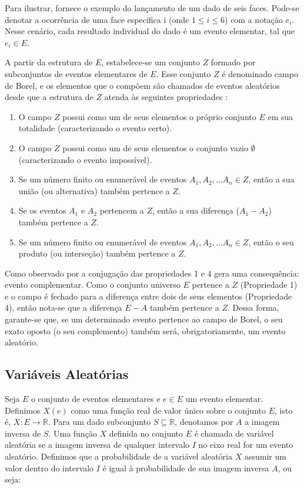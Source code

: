 \documentclass[
    12pt,                %
    openright,           %
    oneside,             %
    a4paper,             %
    english,             %
    brazil               %
]{abntex2}
\begin{document}
Para ilustrar,  fornece o exemplo do lançamento de um dado de seis faces. Pode-se denotar a ocorrência de uma face específica i 
(onde $1 \leq i \leq 6$) com a notação $e_i$. Nesse cenário, cada resultado individual do dado é um evento elementar, tal que $e_i \in E$.

A partir da estrutura de $E$, estabelece-se um conjunto $Z$ formado por subconjuntos de eventos elementares de $E$. Esse conjunto $Z$ é denominado campo de Borel, 
e os elementos que o compõem são chamados de eventos aleatórios desde que a estrutura de $Z$ atenda às seguintes propriedades \cite{FISZ}:

\begin{enumerate}
    \item O campo $Z$ possui como um de seus elementos o próprio conjunto $E$ em sua totalidade (caracterizando o evento certo).
    \item O campo $Z$ possui como um de seus elementos o conjunto vazio $\emptyset$ (caracterizando o evento impossível).
    \item Se um número finito ou enumerável de eventos $A_1, A_2, \dots A_n \in Z$, então a sua união (ou alternativa) também pertence a $Z$.
    \item Se os eventos $A_1$ e $A_2$ pertencem a $Z$, então a sua diferença ($A_1 - A_2$) também pertence a $Z$.
    \item Se um número finito ou enumerável de eventos $A_1, A_2, \dots A_n \in Z$, então o seu produto (ou interseção) também pertence a $Z$.
\end{enumerate}

Como observado por  a conjugação das propriedades 1 e 4 gera uma consequência: evento complementar. Como o conjunto universo $E$ pertence a $Z$ (Propriedade 1) 
e o campo é fechado para a diferença entre dois de seus elementos (Propriedade 4), então nota-se que a diferença $E - A$ também pertence a $Z$. Dessa forma, garante-se que, 
se um determinado evento pertence ao campo de Borel, o seu exato oposto (o seu complemento) também será, obrigatoriamente, um evento aleatório.

\subsection{Variáveis Aleatórias}

Seja $E$ o conjunto de eventos elementares e $e \in E$ um evento elementar. Definimos $X(e)$ como uma função real de valor único sobre o conjunto $E$, isto é, $X: E \to 
\mathbb{R}$. Para um dado subconjunto $S \subseteq \mathbb{R}$, denotamos por $A$ a imagem inversa de $S$.
Uma função $X$ definida no conjunto $E$ é chamada de variável aleatória se a imagem inversa de qualquer intervalo $I$ no eixo real for um evento aleatório.
Definimos que a probabilidade de a variável aleatória $X$ assumir um valor dentro do intervalo $I$ é igual à probabilidade de sua imagem inversa $A$, ou seja:
\end{document}
